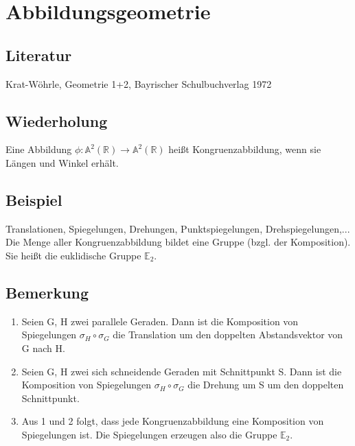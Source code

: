 \section{Abbildungsgeometrie}

\subsection{Literatur} Krat-Wöhrle, Geometrie 1+2, Bayrischer Schulbuchverlag 1972

\subsection{Wiederholung} Eine Abbildung $\phi: \mathbb{A}^2(\mathbb{R}) \rightarrow \mathbb{A}^2(\mathbb{R})$ heißt Kongruenzabbildung, wenn sie Längen und Winkel erhält.

\subsection{Beispiel} Translationen, Spiegelungen, Drehungen, Punktspiegelungen, Drehspiegelungen,...
Die Menge aller Kongruenzabbildung bildet eine Gruppe (bzgl. der Komposition). Sie heißt die euklidische Gruppe $\mathbb{E}_2$.

\subsection{Bemerkung}
\begin{enumerate}
	\item Seien G, H zwei parallele Geraden. Dann ist die Komposition von Spiegelungen $\sigma_H \circ \sigma_G$ die Translation um den doppelten Abstandsvektor von G nach H. 
	\item Seien G, H zwei sich schneidende Geraden mit Schnittpunkt S. Dann ist die Komposition von Spiegelungen $\sigma_H \circ \sigma_G$ die Drehung um S um den doppelten Schnittpunkt. 
	\item Aus 1 und 2 folgt, dass jede Kongruenzabbildung eine Komposition von Spiegelungen ist. Die Spiegelungen erzeugen also die Gruppe $\mathbb{E}_2$.
\end{enumerate}

